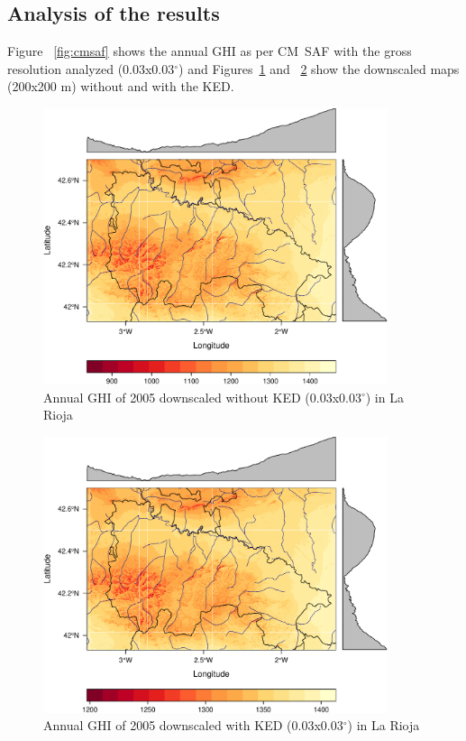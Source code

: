 \documentclass[11pt, english]{article}
\begin{document}
\subsection{Analysis of the results}
\label{sec-1-7}

Figure ~\ref{fig:cmsaf} shows the annual GHI as per CM~SAF with the
gross resolution analyzed (0.03x0.03$^\circ$) and
Figures~\ref{fig:GHInoked} and ~\ref{fig:GHIked} show the downscaled
maps (200x200 m) without and with the KED.

\begin{figure}[H]
  \centering
  \includegraphics[width=0.9\textwidth]{GHI2005adownwithoutKED.pdf}
  \caption{Annual GHI of 2005 downscaled without
    KED (0.03x0.03$^\circ$) in La Rioja}
  \label{fig:GHInoked}
\end{figure}

\begin{figure}[H]
  \centering
  \includegraphics[width=0.9\textwidth]{GHI2005anual003x003.pdf}
  \caption{Annual GHI of 2005 downscaled with
    KED (0.03x0.03$^\circ$) in La Rioja}
  \label{fig:GHIked}
\end{figure}
\end{document}

